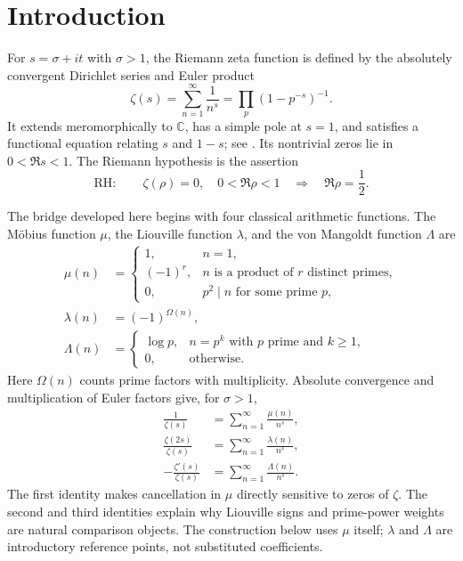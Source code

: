 \documentclass[11pt]{amsart}
\numberwithin{equation}{section}
\theoremstyle{plain}
\theoremstyle{definition}
\theoremstyle{remark}
\newcommand{\C}{\mathbb C}
\newcommand{\RH}{\mathrm{RH}}
\begin{document}
\section{Introduction}
\label{sec:introduction}

For $s=\sigma+it$ with $\sigma>1$, the Riemann zeta function is defined by
the absolutely convergent Dirichlet series and Euler product
\begin{equation}
\zeta(s)=\sum_{n=1}^{\infty}\frac1{n^s}
=\prod_p\left(1-p^{-s}\right)^{-1}.
\label{eq:zeta-series-product}
\end{equation}
It extends meromorphically to $\C$, has a simple pole at $s=1$, and satisfies
a functional equation relating $s$ and $1-s$; see
\cite{Titchmarsh1986,Apostol1976}.  Its nontrivial zeros lie in
$0<\Re s<1$.  The Riemann hypothesis is the assertion
\begin{equation}
\RH:\qquad \zeta(\rho)=0,\quad 0<\Re\rho<1
\quad\Longrightarrow\quad \Re\rho=\frac12.
\label{eq:RH-statement}
\end{equation}

The bridge developed here begins with four classical arithmetic functions.
The M\"obius function $\mu$, the Liouville function $\lambda$, and the von
Mangoldt function $\Lambda$ are
\begin{align}
\mu(n)&=
\begin{cases}
1,&n=1,\\
(-1)^r,&n\text{ is a product of }r\text{ distinct primes},\\
0,&p^2\mid n\text{ for some prime }p,
\end{cases}
\label{eq:mobius-definition}\\
\lambda(n)&=(-1)^{\Omega(n)},
\label{eq:liouville-definition}\\
\Lambda(n)&=
\begin{cases}
\log p,&n=p^k\text{ with }p\text{ prime and }k\ge1,\\
0,&\text{otherwise}.
\end{cases}
\label{eq:mangoldt-definition}
\end{align}
Here $\Omega(n)$ counts prime factors with multiplicity.  Absolute convergence
and multiplication of Euler factors give, for $\sigma>1$,
\begin{align}
\frac1{\zeta(s)}&=\sum_{n=1}^{\infty}\frac{\mu(n)}{n^s},
\label{eq:mobius-zeta}\\
\frac{\zeta(2s)}{\zeta(s)}&=
\sum_{n=1}^{\infty}\frac{\lambda(n)}{n^s},
\label{eq:liouville-zeta}\\
-\frac{\zeta'(s)}{\zeta(s)}&=
\sum_{n=1}^{\infty}\frac{\Lambda(n)}{n^s}.
\label{eq:mangoldt-zeta}
\end{align}
The first identity makes cancellation in $\mu$ directly sensitive to zeros of
$\zeta$.  The second and third identities explain why Liouville signs and
prime-power weights are natural comparison objects.  The construction below
uses $\mu$ itself; $\lambda$ and $\Lambda$ are introductory reference points,
not substituted coefficients.
\end{document}
